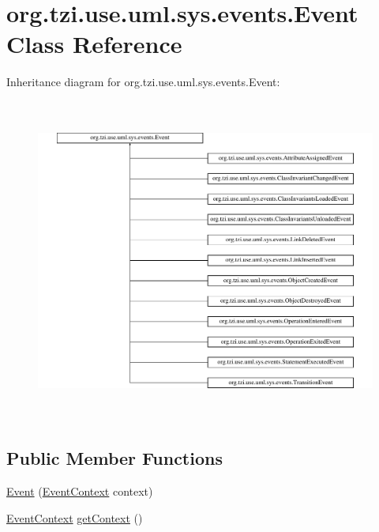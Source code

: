 \hypertarget{classorg_1_1tzi_1_1use_1_1uml_1_1sys_1_1events_1_1_event}{\section{org.\-tzi.\-use.\-uml.\-sys.\-events.\-Event Class Reference}
\label{classorg_1_1tzi_1_1use_1_1uml_1_1sys_1_1events_1_1_event}
}
Inheritance diagram for org.\-tzi.\-use.\-uml.\-sys.\-events.\-Event\-:\begin{figure}[H]
\begin{center}
\leavevmode
\includegraphics[height=10.674486cm]{classorg_1_1tzi_1_1use_1_1uml_1_1sys_1_1events_1_1_event}
\end{center}
\end{figure}
\subsection*{Public Member Functions}
\begin{DoxyCompactItemize}
\item 
\hyperlink{classorg_1_1tzi_1_1use_1_1uml_1_1sys_1_1events_1_1_event_a5345aba2bcd9a9de91d007e7486efa0e}{Event} (\hyperlink{enumorg_1_1tzi_1_1use_1_1uml_1_1sys_1_1events_1_1tags_1_1_event_context}{Event\-Context} context)
\item 
\hyperlink{enumorg_1_1tzi_1_1use_1_1uml_1_1sys_1_1events_1_1tags_1_1_event_context}{Event\-Context} \hyperlink{classorg_1_1tzi_1_1use_1_1uml_1_1sys_1_1events_1_1_event_af5990394765dde359d69036f9ad93a10}{get\-Context} ()
\end{DoxyCompactItemize}


